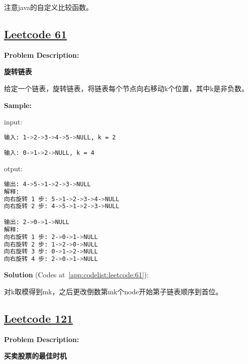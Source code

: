 注意java的自定义比较函数。\par



\subsection{\href{https://leetcode-cn.com/}{Leetcode 61}}\label{app:problemlist:leetcode:61}

\textbf{Problem Description:}\par

\textbf{旋转链表}\par

给定一个链表，旋转链表，将链表每个节点向右移动k个位置，其中k是非负数。\par


\textbf{Sample:}\par

input:\par

\begin{lstlisting}[language=bash]
输入: 1->2->3->4->5->NULL, k = 2

输入: 0->1->2->NULL, k = 4
\end{lstlisting}

otput:\par

\begin{lstlisting}[language=bash]
输出: 4->5->1->2->3->NULL
解释:
向右旋转 1 步: 5->1->2->3->4->NULL
向右旋转 2 步: 4->5->1->2->3->NULL

输出: 2->0->1->NULL
解释:
向右旋转 1 步: 2->0->1->NULL
向右旋转 2 步: 1->2->0->NULL
向右旋转 3 步: 0->1->2->NULL
向右旋转 4 步: 2->0->1->NULL
\end{lstlisting}

\textbf{Solution }(Codes at~\ref{app:codelist:leetcode:61}):\par

对k取模得到mk，之后更改倒数第mk个node开始第子链表顺序到首位。\par



\subsection{\href{https://leetcode-cn.com/}{Leetcode 121}}\label{app:problemlist:leetcode:121}

\textbf{Problem Description:}\par

\textbf{买卖股票的最佳时机}\par

